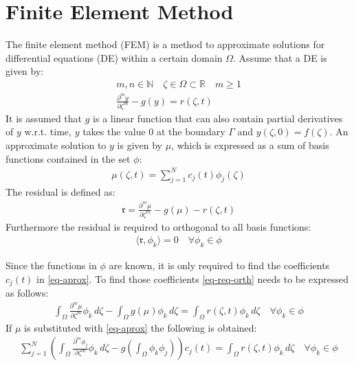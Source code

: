 \section{Finite Element Method}
The finite element method (FEM) is a method to approximate solutions for differential equations (DE) within a certain domain \(\Omega\).
Assume that a DE is given by:
\begin{gather}
m, n \in \mathbb{N} \quad \zeta \in \Omega \subset \mathbb{R} \quad m \geq 1 \\
\frac{\partial^{m} y}{\partial \zeta^{m}} -  g(y) = r(\zeta, t) \label{eq-pde-gen} 
\end{gather}
It is assumed that \(g\) is a linear function that can also contain partial derivatives of \(y\) w.r.t. time, \(y\) takes the value 0 at the boundary \(\Gamma\) and \(y(\zeta, 0) = f(\zeta)\).
An approximate solution to \(y\) is given by \(\mu\), which is expressed as a sum of basis functions contained in the set \(\phi\):
\begin{gather}
\mu(\zeta, t) = \sum_{j = 1}^{N} c_{j}(t)\phi_{j}(\zeta) \label{eq-aprox}
\end{gather}
The residual is defined as:
\begin{gather}
\mathfrak{r} = \frac{\partial^{m} \mu}{\partial \zeta^{m}} -  g(\mu) - r(\zeta, t) 
\end{gather}
Furthermore the residual is required to orthogonal to all basis functions:
\begin{gather}
\langle \mathfrak{r}, \phi_{k} \rangle = 0 \quad \forall \phi_{k} \in \phi \label{eq-req-orth}
\end{gather}

Since the functions in \(\phi\) are known, it is only required to find the coefficients \(c_{j}(t)\) in \ref{eq-aprox}.
To find those coefficients \ref{eq-req-orth} needs to be expressed as follows:
\begin{gather}
\int_{\Omega} \frac{\partial^{m} \mu}{\partial \zeta^{m}} \phi_{k} \, d\zeta  -  \int_{\Omega} g(\mu) \phi_{k}        \, d\zeta = \int_{\Omega}  r(\zeta, t) \phi_{k}        \, d\zeta \quad \forall \phi_{k} \in \phi \label{eq-req-orth}
\end{gather}
If \(\mu\) is substituted with \ref{eq-aprox} the following is obtained:
\begin{gather}
\sum_{j = 1}^{N} (\int_{\Omega} \frac{\partial^{m} \phi_{j}}{\partial \zeta^{m}} \phi_{k} \, d\zeta - g(\int_{\Omega} \phi_k \phi_j)) c_{j}(t) = \int_{\Omega}  r(\zeta, t) \phi_{k}        \, d\zeta \quad \forall \phi_{k} \in \phi \label{eq-req-orth}
\end{gather}

